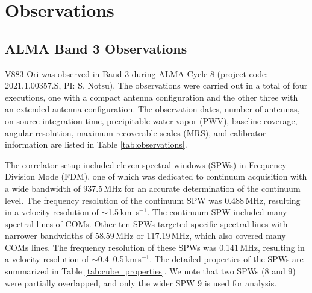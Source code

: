 \documentclass[linenumbers, twocolumn, twocolappendix, astrosymb, times]{aastex631}
\newcommand{\hcotp}{HCO$_2^+$}
\begin{document}
\section{Observations} \label{sec:observation}

\subsection{ALMA Band 3 Observations}
V883 Ori was observed in Band 3 during ALMA Cycle 8 (project code: 2021.1.00357.S, PI: S. Notsu). The observations were carried out in a total of four executions, one with a compact antenna configuration and the other three with an extended antenna configuration. The observation dates, number of antennas, on-source integration time, precipitable water vapor (PWV), baseline coverage, angular resolution, maximum recoverable scales (MRS), and calibrator information are listed in Table \ref{tab:observations}. 

The correlator setup included eleven spectral windows (SPWs) in Frequency Division Mode (FDM), one of which was dedicated to continuum acquisition with a wide bandwidth of 937.5\,MHz for an accurate determination of the continuum level. The frequency resolution of the continuum SPW was 0.488\,MHz, resulting in a velocity resolution of $\sim$1.5\,km \,s$^{-1}$. The continuum SPW included many spectral lines of COMs. Other ten SPWs targeted specific spectral lines with narrower bandwidths of 58.59\,MHz or 117.19\,MHz, which also covered many COMs lines. The frequency resolution of these SPWs was 0.141\,MHz, resulting in a velocity resolution of $\sim$0.4--0.5\,km\,s$^{-1}$. 
The detailed properties of the SPWs are summarized in Table \ref{tab:cube_properties}. We note that two SPWs (8 and 9) were partially overlapped, and only the wider SPW 9 is used for analysis. 
\end{document}
